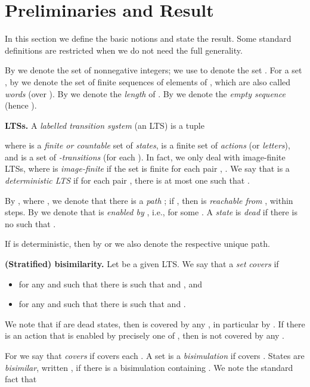 \documentclass{llncs}
\begin{document}
\section{Preliminaries and Result}\label{sec:prelim}



In this section we define the basic notions and 
state the result.
Some standard definitions are restricted 
when we do not need the full generality.

By  we denote the 
set  of nonnegative integers; we use 
 to denote the set .
For a set , by  we denote the set of finite
sequences of elements of , which are also called \emph{words}
(over ).
By  we denote the
\emph{length} of 
. 
By  we denote the \emph{empty sequence}
(hence ).


\textbf{LTSs.}
A \emph{labelled transition system} (an LTS) 
is a tuple 
\begin{center}

\end{center}
where  is a \emph{finite or countable}
set of \emph{states},
 is a finite 
set of \emph{actions} (or \emph{letters}),
and  is a set of
\emph{-transitions} (for each ). 
In fact, we only deal with  
image-finite LTSs, where 
 is \emph{image-finite}
if the set  is finite for each 
pair , .  We say that  is 
a \emph{deterministic LTS} if for each pair 
,  there is 
 at most one  such that .

By , where 
,
we denote 
that there is a \emph{path}
;
if , then  
 is \emph{reachable from} , within  steps.
By  we denote that  is
\emph{enabled by} , i.e.,  for some .
A \emph{state}  is \emph{dead} if 
there is no  such that .

If  is deterministic, 
then by  or  we also denote the respective
unique path.
 
\textbf{(Stratified) bisimilarity.}
Let   be a given
LTS.
We say that a \emph{set}   
\emph{covers} 
 if 
\begin{itemize}
	\item		
for any  and  such that 
 there is 
such that
 and 
, and
\item
for any  and  such that 
 there is 
such that
 and 
.
\end{itemize}
We note that if  are dead states, 
then  is covered by any , 
in particular by .
If there is an action  that is enabled by precisely one
of , then   is not covered by
any .

For 
we say that  \emph{covers}  if 
covers each .
A set 
is a \emph{bisimulation} if  covers .
States  are \emph{bisimilar},
written 
,
if there is a bisimulation
 containing . 
We note the standard 
fact that 
\end{document}
